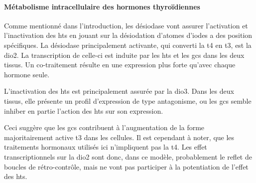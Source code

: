 \documentclass[../main.tex]{subfiles}
\begin{document}
\paragraph{Métabolisme intracellulaire des hormones thyroïdiennes}
Comme mentionné dans l'introduction, les désiodase vont assurer l'activation et l'inactivation des \glspl{ht} en jouant sur la désiodation d'atomes d'iodes a des position spécifiques.
La désiodase principalement activante, qui converti la \gls{t4} en \gls{t3}, est la \gls{dio2}.
La transcription de celle-ci est induite par les \glspl{ht} et les \glspl{gc} dans les deux tissus.
Un co-traitement résulte en une expression plus forte qu'avec chaque hormone seule.
\par
L'inactivation des \glspl{ht} est principalement assurée par la \gls{dio3}.
Dans les deux tissus, elle présente un profil d'expression de type antagonisme, ou les \glspl{gc} semble inhiber en partie l'action des \glspl{ht} sur son expression.
\par
Ceci suggère que les \glspl{gc} contribuent à l'augmentation de la forme majoritairement active \gls{t3} dans les cellules.
Il est cependant à noter, que les traitements hormonaux utilisés ici n'impliquent pas la \gls{t4}.
Les effet transcriptionnels sur la \gls{dio2} sont donc, dans ce modèle, probablement le reflet de boucles de rétro-contrôle, mais ne vont pas participer à la potentiation de l'effet des \glspl{ht}.
\end{document}
